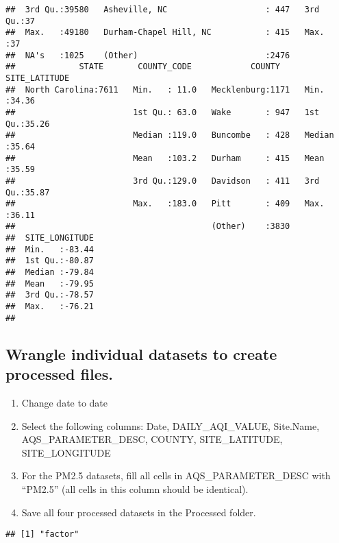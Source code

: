 \documentclass[]{article}
\newenvironment{Shaded}{\begin{snugshade}}{\end{snugshade}}
\newcommand{\KeywordTok}[1]{\textcolor[rgb]{0.13,0.29,0.53}{\textbf{#1}}}
\newcommand{\CommentTok}[1]{\textcolor[rgb]{0.56,0.35,0.01}{\textit{#1}}}
\newcommand{\OperatorTok}[1]{\textcolor[rgb]{0.81,0.36,0.00}{\textbf{#1}}}
\newcommand{\NormalTok}[1]{#1}
\providecommand{\tightlist}{%
  \setlength{\itemsep}{0pt}\setlength{\parskip}{0pt}}
\begin{document}
\begin{verbatim}
##  3rd Qu.:39580   Asheville, NC                    : 447   3rd Qu.:37  
##  Max.   :49180   Durham-Chapel Hill, NC           : 415   Max.   :37  
##  NA's   :1025    (Other)                          :2476               
##             STATE       COUNTY_CODE            COUNTY     SITE_LATITUDE  
##  North Carolina:7611   Min.   : 11.0   Mecklenburg:1171   Min.   :34.36  
##                        1st Qu.: 63.0   Wake       : 947   1st Qu.:35.26  
##                        Median :119.0   Buncombe   : 428   Median :35.64  
##                        Mean   :103.2   Durham     : 415   Mean   :35.59  
##                        3rd Qu.:129.0   Davidson   : 411   3rd Qu.:35.87  
##                        Max.   :183.0   Pitt       : 409   Max.   :36.11  
##                                        (Other)    :3830                  
##  SITE_LONGITUDE  
##  Min.   :-83.44  
##  1st Qu.:-80.87  
##  Median :-79.84  
##  Mean   :-79.95  
##  3rd Qu.:-78.57  
##  Max.   :-76.21  
## 
\end{verbatim}

\subsection{Wrangle individual datasets to create processed
files.}\label{wrangle-individual-datasets-to-create-processed-files.}

\begin{enumerate}
\def\labelenumi{\arabic{enumi}.}
\setcounter{enumi}{2}
\tightlist
\item
  Change date to date
\item
  Select the following columns: Date, DAILY\_AQI\_VALUE, Site.Name,
  AQS\_PARAMETER\_DESC, COUNTY, SITE\_LATITUDE, SITE\_LONGITUDE
\item
  For the PM2.5 datasets, fill all cells in AQS\_PARAMETER\_DESC with
  ``PM2.5'' (all cells in this column should be identical).
\item
  Save all four processed datasets in the Processed folder.
\end{enumerate}

\begin{Shaded}
\end{Shaded}

\begin{verbatim}
## [1] "factor"
\end{verbatim}
\end{document}
